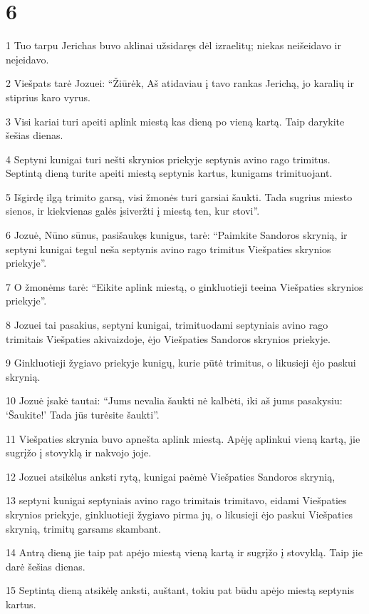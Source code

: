 \chapter{6}

\par 1 Tuo tarpu Jerichas buvo aklinai užsidaręs dėl izraelitų; niekas neišeidavo ir neįeidavo. 
\par 2 Viešpats tarė Jozuei: “Žiūrėk, Aš atidaviau į tavo rankas Jerichą, jo karalių ir stiprius karo vyrus. 
\par 3 Visi kariai turi apeiti aplink miestą kas dieną po vieną kartą. Taip darykite šešias dienas. 
\par 4 Septyni kunigai turi nešti skrynios priekyje septynis avino rago trimitus. Septintą dieną turite apeiti miestą septynis kartus, kunigams trimituojant. 
\par 5 Išgirdę ilgą trimito garsą, visi žmonės turi garsiai šaukti. Tada sugrius miesto sienos, ir kiekvienas galės įsiveržti į miestą ten, kur stovi”. 
\par 6 Jozuė, Nūno sūnus, pasišaukęs kunigus, tarė: “Paimkite Sandoros skrynią, ir septyni kunigai tegul neša septynis avino rago trimitus Viešpaties skrynios priekyje”. 
\par 7 O žmonėms tarė: “Eikite aplink miestą, o ginkluotieji teeina Viešpaties skrynios priekyje”. 
\par 8 Jozuei tai pasakius, septyni kunigai, trimituodami septyniais avino rago trimitais Viešpaties akivaizdoje, ėjo Viešpaties Sandoros skrynios priekyje. 
\par 9 Ginkluotieji žygiavo priekyje kunigų, kurie pūtė trimitus, o likusieji ėjo paskui skrynią. 
\par 10 Jozuė įsakė tautai: “Jums nevalia šaukti nė kalbėti, iki aš jums pasakysiu: ‘Šaukite!’ Tada jūs turėsite šaukti”. 
\par 11 Viešpaties skrynia buvo apnešta aplink miestą. Apėję aplinkui vieną kartą, jie sugrįžo į stovyklą ir nakvojo joje. 
\par 12 Jozuei atsikėlus anksti rytą, kunigai paėmė Viešpaties Sandoros skrynią, 
\par 13 septyni kunigai septyniais avino rago trimitais trimitavo, eidami Viešpaties skrynios priekyje, ginkluotieji žygiavo pirma jų, o likusieji ėjo paskui Viešpaties skrynią, trimitų garsams skambant. 
\par 14 Antrą dieną jie taip pat apėjo miestą vieną kartą ir sugrįžo į stovyklą. Taip jie darė šešias dienas. 
\par 15 Septintą dieną atsikėlę anksti, auštant, tokiu pat būdu apėjo miestą septynis kartus. 
